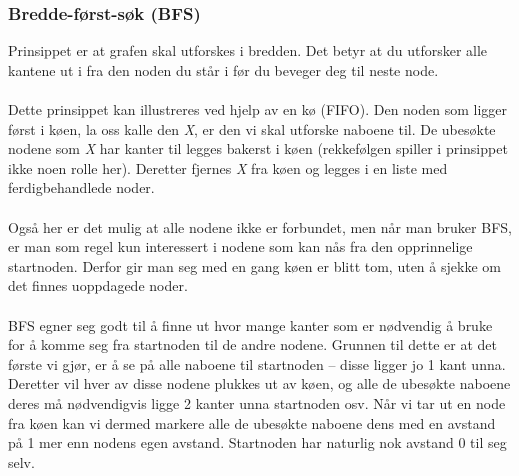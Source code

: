 \subsubsection{Bredde-først-søk (BFS)}
Prinsippet er at grafen skal utforskes i bredden. Det betyr at du utforsker alle kantene ut i fra den noden du står i før du beveger deg til neste node. 
\\\\
Dette prinsippet kan illustreres ved hjelp av en kø (FIFO). Den noden som ligger først i køen, la oss kalle den \textit{X}, er den vi skal utforske naboene til. De ubesøkte nodene som \textit{X} har kanter til legges bakerst i køen (rekkefølgen spiller i prinsippet ikke noen rolle her). Deretter fjernes \textit{X} fra køen og legges i en liste med ferdigbehandlede noder.
\\\\
Også her er det mulig at alle nodene ikke er forbundet, men når man bruker BFS, er man som regel kun interessert i nodene som kan nås fra den opprinnelige startnoden. Derfor gir man seg med en gang køen er blitt tom, uten å sjekke om det finnes uoppdagede noder.
\\\\
BFS egner seg godt til å finne ut hvor mange kanter som er nødvendig å bruke for å komme seg fra startnoden til de andre nodene. Grunnen til dette er at det første vi gjør, er å se på alle naboene til startnoden – disse ligger jo 1 kant unna. Deretter vil hver av disse nodene plukkes ut av køen, og alle de ubesøkte naboene deres må nødvendigvis ligge 2 kanter unna startnoden osv. Når vi tar ut en node fra køen kan vi dermed markere alle de ubesøkte naboene dens med en avstand på 1 mer enn nodens egen avstand. Startnoden har naturlig nok avstand 0 til seg selv.

